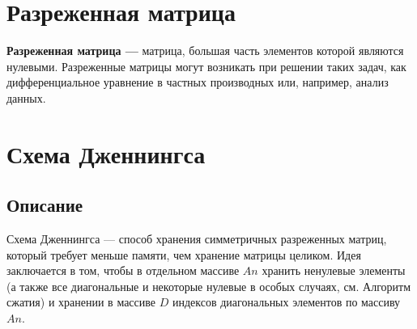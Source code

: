 \documentclass[12pt, a4paper]{article}
\begin{document}
\section{Разреженная матрица}
\textbf{Разреженная матрица ---} матрица, большая часть 
элементов которой являются нулевыми. Разреженные матрицы 
могут возникать при решении таких задач, как 
дифференциальное уравнение в частных производных или,
например, анализ данных.
\section{Схема Дженнингса}
\subsection{Описание}
Схема Дженнингса --- способ хранения симметричных 
разреженных матриц, который требует меньше памяти, 
чем хранение матрицы целиком. 
Идея заключается в том, чтобы в отдельном массиве 
$An$ хранить ненулевые элементы (а также все
диагональные и некоторые нулевые в особых случаях, 
см. Алгоритм сжатия) и хранении в массиве $D$
индексов диагональных элементов по массиву $An$.
\end{document}
